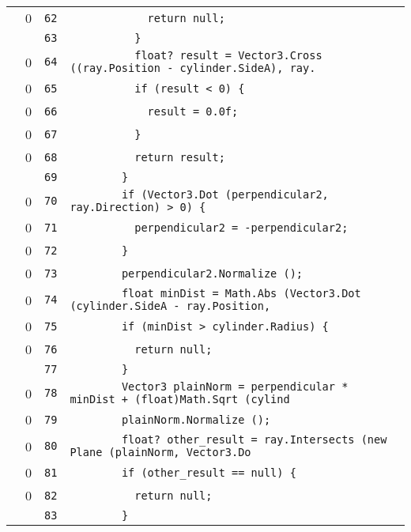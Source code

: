 \documentclass[a4paper,10pt]{article}
\begin{document}
\begin{longtable}[l]{lrrl}
\cellcolor{red} & 0 & \verb~62~ & \verb~            return null;~\\
\cellcolor{gray} &  & \verb~63~ & \verb~          }~\\
\cellcolor{red} & 0 & \verb~64~ & \verb~          float? result = Vector3.Cross ((ray.Position - cylinder.SideA), ray.~\\
\cellcolor{red} & 0 & \verb~65~ & \verb~          if (result < 0) {~\\
\cellcolor{red} & 0 & \verb~66~ & \verb~            result = 0.0f;~\\
\cellcolor{red} & 0 & \verb~67~ & \verb~          }~\\
\cellcolor{red} & 0 & \verb~68~ & \verb~          return result;~\\
\cellcolor{gray} &  & \verb~69~ & \verb~        }~\\
\cellcolor{red} & 0 & \verb~70~ & \verb~        if (Vector3.Dot (perpendicular2, ray.Direction) > 0) {~\\
\cellcolor{red} & 0 & \verb~71~ & \verb~          perpendicular2 = -perpendicular2;~\\
\cellcolor{red} & 0 & \verb~72~ & \verb~        }~\\
\cellcolor{red} & 0 & \verb~73~ & \verb~        perpendicular2.Normalize ();~\\
\cellcolor{red} & 0 & \verb~74~ & \verb~        float minDist = Math.Abs (Vector3.Dot (cylinder.SideA - ray.Position, ~\\
\cellcolor{red} & 0 & \verb~75~ & \verb~        if (minDist > cylinder.Radius) {~\\
\cellcolor{red} & 0 & \verb~76~ & \verb~          return null;~\\
\cellcolor{gray} &  & \verb~77~ & \verb~        }~\\
\cellcolor{red} & 0 & \verb~78~ & \verb~        Vector3 plainNorm = perpendicular * minDist + (float)Math.Sqrt (cylind~\\
\cellcolor{red} & 0 & \verb~79~ & \verb~        plainNorm.Normalize ();~\\
\cellcolor{red} & 0 & \verb~80~ & \verb~        float? other_result = ray.Intersects (new Plane (plainNorm, Vector3.Do~\\
\cellcolor{red} & 0 & \verb~81~ & \verb~        if (other_result == null) {~\\
\cellcolor{red} & 0 & \verb~82~ & \verb~          return null;~\\
\cellcolor{gray} &  & \verb~83~ & \verb~        }~\\

\end{longtable}
\end{document}
